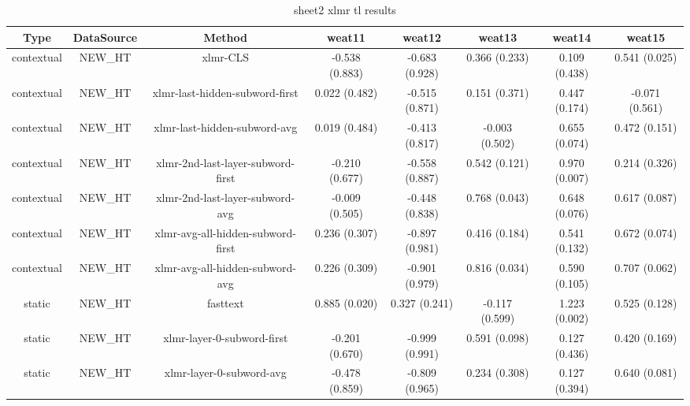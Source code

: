 \begin{sidewaystable}[htb]
    \centering
    \caption{sheet2 xlmr tl results}
    \label{appendix_tab:sheet2_xlmr_tl_results}
    \small
    \begin{tabular}{@{}cccccccc@{}}
        \toprule
        Type & DataSource & Method & weat11 & weat12 & weat13 & weat14 & weat15 \\
        \midrule
        contextual & NEW\_HT & xlmr-CLS & -0.538 (0.883) & -0.683 (0.928) & 0.366 (0.233) & 0.109 (0.438) & 0.541 (0.025) \\
        contextual & NEW\_HT & xlmr-last-hidden-subword-first & 0.022 (0.482) & -0.515 (0.871) & 0.151 (0.371) & 0.447 (0.174) & -0.071 (0.561) \\
        contextual & NEW\_HT & xlmr-last-hidden-subword-avg & 0.019 (0.484) & -0.413 (0.817) & -0.003 (0.502) & 0.655 (0.074) & 0.472 (0.151) \\
        contextual & NEW\_HT & xlmr-2nd-last-layer-subword-first & -0.210 (0.677) & -0.558 (0.887) & 0.542 (0.121) & 0.970 (0.007) & 0.214 (0.326) \\
        contextual & NEW\_HT & xlmr-2nd-last-layer-subword-avg & -0.009 (0.505) & -0.448 (0.838) & 0.768 (0.043) & 0.648 (0.076) & 0.617 (0.087) \\
        contextual & NEW\_HT & xlmr-avg-all-hidden-subword-first & 0.236 (0.307) & -0.897 (0.981) & 0.416 (0.184) & 0.541 (0.132) & 0.672 (0.074) \\
        contextual & NEW\_HT & xlmr-avg-all-hidden-subword-avg & 0.226 (0.309) & -0.901 (0.979) & 0.816 (0.034) & 0.590 (0.105) & 0.707 (0.062) \\
        static & NEW\_HT & fasttext & 0.885 (0.020) & 0.327 (0.241) & -0.117 (0.599) & 1.223 (0.002) & 0.525 (0.128) \\
        static & NEW\_HT & xlmr-layer-0-subword-first & -0.201 (0.670) & -0.999 (0.991) & 0.591 (0.098) & 0.127 (0.436) & 0.420 (0.169) \\
        static & NEW\_HT & xlmr-layer-0-subword-avg & -0.478 (0.859) & -0.809 (0.965) & 0.234 (0.308) & 0.127 (0.394) & 0.640 (0.081) \\
        \bottomrule
    \end{tabular}
\end{sidewaystable}